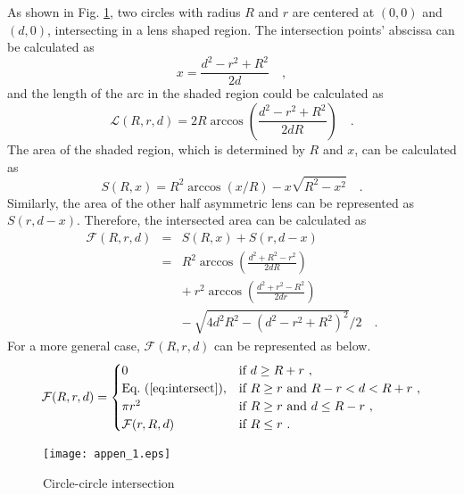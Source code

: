 \documentclass[journal, 10pt]{IEEEtran}
\begin{document}
As shown in Fig. \ref{fig:app_1}, two circles with radius $R$ and $r$
are centered at $(0, 0)$ and $(d, 0)$, intersecting in a lens shaped
region. The intersection points' abscissa can be calculated as
\begin{equation}
x= \frac{d^2 - r^2 + R^2}{2d}\quad,
\end{equation}
and the length of the arc in the shaded region could be calculated as
\begin{equation}
\mathcal{L}(R, r, d) = 2R\arccos\left(  \frac{d^2 - r^2 + R^2}{2dR} \right)\quad.
\end{equation}
The area of the shaded region, which is determined by $R$ and $x$, can be 
calculated as
\begin{equation}
S(R, x) = R^2 \arccos (x/R) - x \sqrt{R^2 - x^2}\quad.
\end{equation}
Similarly, the area of the other half asymmetric lens can be represented as 
$S(r, d-x)$. Therefore, the intersected area can be calculated as
\setlength{\arraycolsep}{0.0em}
\begin{eqnarray}
\mathcal{F}(R,r,d) &{}={}& S(R, x) + S(r, d-x) \nonumber\\
&{}={}& R^2 \arccos \left(\frac{d^2 + R^2 - r^2}{2dR}\right) \nonumber\\
&&{+}\: r^2 \arccos \left(\frac{d^2 + r^2 - R^2}{2dr}\right) \nonumber\\
&&{-}\:  \sqrt{4d^2 R^2 - (d^2 - r^2 + R^2)^2 } /2 \quad. \label{eq:intersect}
\end{eqnarray}
\setlength{\arraycolsep}{5pt}
For a more general case, $\mathcal{F}(R,r,d)$ can be represented as below.
\begin{equation}
\mathcal{F}(R,r,d) =  \begin{cases}
0 & \text{if~} d \geq R+r ~,\\
\text{Eq.}~(\ref{eq:intersect}), & \text{if~} R \geq r \text{~and~} R-r < d < R+r ~, \\
\pi r^2 & \text{if~} R \geq r \text{~and~} d \leq  R-r~, \\
\mathcal{F}(r,R,d) & \text{if~} R \leq r ~.
\end{cases}
\end{equation}
\begin{figure}[!htb]
\centering 
\texttt{[image: appen\_1.eps]} 
\caption{Circle-circle intersection} \label{fig:app_1} 
\end{figure}
\end{document}

